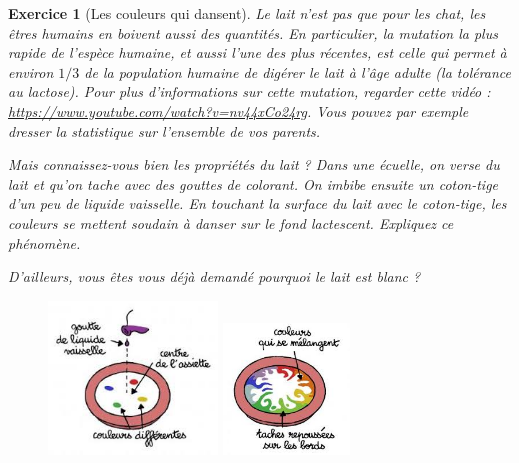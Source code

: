 \documentclass[12pt]{article}
\theoremstyle{break}
\newtheorem{exo}{Exercice}
\begin{document}
\begin{exo}[Les couleurs qui dansent]
Le lait n'est pas que pour les chat, les êtres humains en boivent aussi des quantités. En particulier, la mutation la plus rapide de l'espèce humaine, et aussi l'une des plus récentes, est celle qui permet à environ $1/3$ de la population humaine de digérer le lait à l'âge adulte (la tolérance au lactose). Pour plus d'informations sur cette mutation, regarder cette vidéo : \url{https://www.youtube.com/watch?v=nv44xCo24rg}. Vous pouvez par exemple dresser la statistique sur l'ensemble de vos parents.

Mais connaissez-vous bien les propriétés du lait ? Dans une écuelle, on verse du lait et qu'on tache avec des gouttes de colorant. On imbibe ensuite un coton-tige d'un peu de liquide vaisselle. En touchant la surface du lait avec le coton-tige, les couleurs se mettent soudain à danser sur le fond lactescent. Expliquez ce phénomène.

D'ailleurs, vous êtes vous déjà demandé pourquoi le lait est blanc ?

\begin{figure}[h!]
	\centering
    \includegraphics[width=0.4\textwidth]{LaitColorants.jpg}
    \includegraphics[width=0.3\textwidth]{LaitColorants2.jpg}
\end{figure}
\end{exo}
\end{document}
